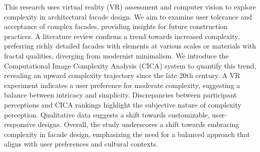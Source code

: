 


This research uses virtual reality (VR) assessment and computer vision to explore complexity in architectural facade design.
We aim to examine user tolerance and acceptance of complex facades, providing insights for future construction practices.
A literature review confirms a trend towards increased complexity, preferring richly detailed facades with elements at various scales or materials with fractal qualities, diverging from modernist minimalism.
We introduce the Computational Image Complexity Analysis (CICA) system to quantify this trend, revealing an upward complexity trajectory since the late 20th century.
A VR experiment indicates a user preference for moderate complexity, suggesting a balance between intricacy and simplicity.
Discrepancies between participant perceptions and CICA rankings highlight the subjective nature of complexity perception.
Qualitative data suggests a shift towards customizable, user-responsive designs.
Overall, the study underscores a shift towards embracing complexity in facade design, emphasizing the need for a balanced approach that aligns with user preferences and cultural contexts.




